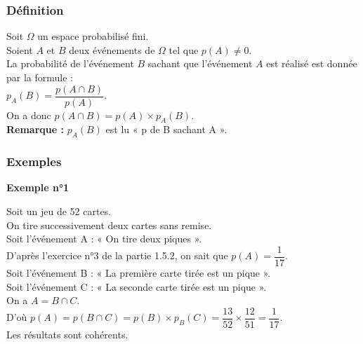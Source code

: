 \newpage

\subsubsection{Définition}

Soit $\Omega$ un espace probabilisé fini. \\
Soient $A$ et $B$ deux événements de $\Omega$ tel que $p\left(A\right) \neq 0$. \\

La probabilité de l'événement $B$ sachant que l'événement $A$ est réalisé est donnée par la formule : \\

$p_A\left(B\right) = \dfrac{p\left(A \cap B\right)}{p\left(A\right)}$. \\

On a donc $p\left(A \cap B\right) = p\left(A\right) \times p_A\left(B\right)$. \\

\textbf{Remarque :} $p_A\left(B\right)$ est lu « p de B sachant A ».

\subsubsection{Exemples}

\textbf{Exemple n°1} 

Soit un jeu de 52 cartes. \\

On tire successivement deux cartes sans remise. \\

Soit l'événement A : « On tire deux piques ». \\

D'après l'exercice n°3 de la partie 1.5.2, on sait que $p\left(A\right) = \dfrac{1}{17}$. \\

Soit l'événement B : « La première carte tirée est un pique ». \\
Soit l'événement C : « La seconde carte tirée est un pique ». \\

On a $A = B \cap C$. \\
D'où $p\left(A\right) = p\left(B\cap C\right) = p\left(B\right) \times p_B\left(C\right) = \dfrac{13}{52} \times \dfrac{12}{51} = \dfrac{1}{17}$. \\

Les résultats sont cohérents. \\

